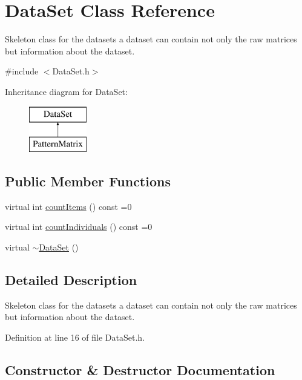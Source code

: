 \hypertarget{classDataSet}{}\section{Data\+Set Class Reference}
\label{classDataSet}


Skeleton class for the datasets a dataset can contain not only the raw matrices but information about the dataset.  




{\ttfamily \#include $<$Data\+Set.\+h$>$}

Inheritance diagram for Data\+Set\+:\begin{figure}[H]
\begin{center}
\leavevmode
\includegraphics[height=2.000000cm]{classDataSet}
\end{center}
\end{figure}
\subsection*{Public Member Functions}
\begin{DoxyCompactItemize}
\item 
virtual int \hyperlink{classDataSet_acbd07a4d4acc27332ec4f323e600885a}{count\+Items} () const =0
\item 
virtual int \hyperlink{classDataSet_a0514da0d8d87fc9503458b3c11978e67}{count\+Individuals} () const =0
\item 
virtual \hyperlink{classDataSet_a2cdb84d32331956b413ca36933e516bd}{$\sim$\+Data\+Set} ()
\end{DoxyCompactItemize}


\subsection{Detailed Description}
Skeleton class for the datasets a dataset can contain not only the raw matrices but information about the dataset. 

Definition at line 16 of file Data\+Set.\+h.



\subsection{Constructor \& Destructor Documentation}
\hypertarget{classDataSet_a2cdb84d32331956b413ca36933e516bd}{}
